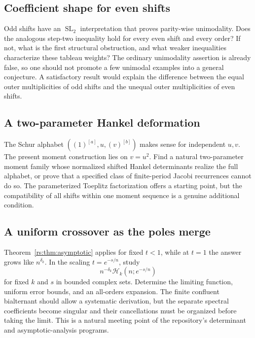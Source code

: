 \documentclass[11pt]{article}
\theoremstyle{definition}
\theoremstyle{remark}
\newcommand{\Ht}{\mathcal H}
\newcommand{\SL}{\operatorname{SL}}
\newcommand{\rep}[2]{(#1)^{[#2]}}
\theoremstyle{definition}
\theoremstyle{plain}
\numberwithin{equation}{section}
\begin{document}
\noindent[Added 30 September 2026, batch 66: answered in Part~III.
Theorem~\ref{cp:thm:main} gives these multiplicities in closed form as a
function of $k$, the root order $\ell\ge3$ and the residue class,
including empty residue classes and factors that disappear: at most one
residue class can lose order relative to the maximum-degree baseline:
one order in general, three for $\ell=4$, $k\equiv1\pmod4$, $k\ge9$,
and the whole simple factor for $\ell=4$, $k=5$. Corollary~\ref{cp:cor:complex} completes the
classification at every complex parameter.]

\subsection{Coefficient shape for even shifts}
Odd shifts have an $\SL_2$ interpretation that proves parity-wise
unimodality. Does the analogous step-two inequality hold for every even
shift and every order? If not, what is the first structural obstruction, and
what weaker inequalities characterize these tableau weights? The ordinary
unimodality assertion is already false, so one should not promote a few
unimodal examples into a general conjecture. A satisfactory result would
explain the difference between the equal outer multiplicities of odd shifts
and the unequal outer multiplicities of even shifts.

\subsection{A two-parameter Hankel deformation}
The Schur alphabet $(\rep1a,u,\rep vb)$ makes sense for independent $u,v$.
The present moment construction lies on $v=u^2$. Find a natural two-parameter
moment family whose normalized shifted Hankel determinants realize the
full alphabet, or prove that a specified class of finite-period Jacobi
recurrences cannot do so. The parameterized Toeplitz factorization offers a
starting point, but the compatibility of all shifts within one moment
sequence is a genuine additional condition.

\subsection{A uniform crossover as the poles merge}
Theorem~\ref{rs:thm:asymptotic} applies for fixed $t<1$, while at $t=1$ the
answer grows like $n^{\delta_k}$. In the scaling $t=e^{-s/n}$, study
\[
 n^{-\delta_k}\Ht_k(n;e^{-s/n})
\]
for fixed $k$ and $s$ in bounded complex sets. Determine the limiting
function, uniform error bounds, and an all-orders expansion. The finite
confluent bialternant should allow a systematic derivation, but the separate
spectral coefficients become singular and their cancellations must be
organized before taking the limit. This is a natural meeting point of the
repository's determinant and asymptotic-analysis programs.
\end{document}

